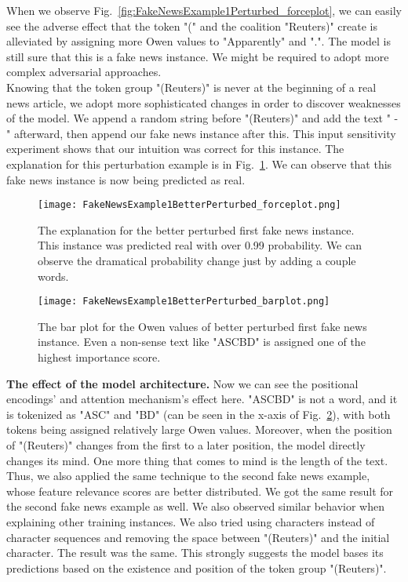 When we observe Fig.~\ref{fig:FakeNewsExample1Perturbed_forceplot}, we can easily see the adverse effect that the token "(" and the coalition "Reuters)" create is alleviated by assigning more Owen values to "Apparently" and ".". The model is still sure that this is a fake news instance. We might be required to adopt more complex adversarial approaches.\\
Knowing that the token group "(Reuters)" is never at the beginning of a real news article, we adopt more sophisticated changes in order to discover weaknesses of the model. We append a random string before "(Reuters)" and add the text " - " afterward, then append our fake news instance after this. This input sensitivity experiment shows that our intuition was correct for this instance. The explanation for this perturbation example is in Fig.~\ref{fig:FakeNewsExample1BetterPerturbed_forceplot}. We can observe that this fake news instance is now being predicted as real.\\
\begin{figure}
    \centering
    \texttt{[image: FakeNewsExample1BetterPerturbed\_forceplot.png]}
    \caption[The explanation for the better perturbed first fake news instance.]{The explanation for the better perturbed first fake news instance. This instance was predicted real with over 0.99 probability. We can observe the dramatical probability change just by adding a couple words.}
    \label{fig:FakeNewsExample1BetterPerturbed_forceplot}
\end{figure}
\begin{figure}
    \centering
    \texttt{[image: FakeNewsExample1BetterPerturbed\_barplot.png]}
    \caption[The bar plot for the Owen values of better perturbed first fake news instance.]{The bar plot for the Owen values of better perturbed first fake news instance. Even a non-sense text like "ASCBD" is assigned one of the highest importance score.}
    \label{fig:FakeNewsExample1BetterPerturbed_barplot}
\end{figure}
\textbf{The effect of the model architecture.} Now we can see the positional encodings' and attention mechanism's effect here. "ASCBD" is not a word, and it is tokenized as "ASC" and "BD" (can be seen in the x-axis of Fig.~\ref{fig:FakeNewsExample1BetterPerturbed_barplot}), with both tokens being assigned relatively large Owen values. Moreover, when the position of "(Reuters)" changes from the first to a later position, the model directly changes its mind. One more thing that comes to mind is the length of the text. Thus, we also applied the same technique to the second fake news example, whose feature relevance scores are better distributed. We got the same result for the second fake news example as well. We also observed similar behavior when explaining other training instances. We also tried using characters instead of character sequences and removing the space between "(Reuters)" and the initial character. The result was the same. This strongly suggests the model bases its predictions based on the existence and position of the token group "(Reuters)".\\
